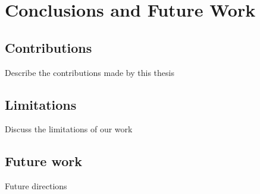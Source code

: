 \chapter{Conclusions  and Future Work}
\label{chap:conclusions}
\section{Contributions} Describe the contributions made by this thesis

\section{Limitations} Discuss the limitations of our work

\section{Future work} Future directions
